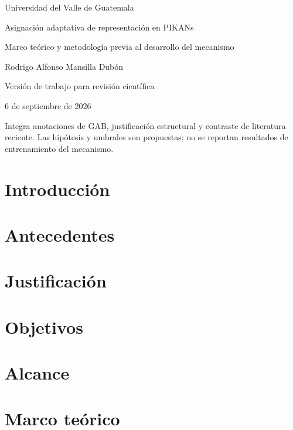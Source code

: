 \documentclass[11pt,letterpaper]{report}
\newcommand{\revision}{Versión de trabajo para revisión científica}
\begin{document}
\hypersetup{pageanchor=false}
\begin{titlepage}\centering
{\Large Universidad del Valle de Guatemala\par}\vspace{1.7cm}
{\Huge Asignación adaptativa de representación en PIKANs\par}\vspace{0.7cm}
{\Large Marco teórico y metodología previa al desarrollo del mecanismo\par}\vfill
{\large Rodrigo Alfonso Mansilla Dubón\par}\vspace{0.6cm}
\revision\par 6 de septiembre de 2026\par\vspace{1cm}
\small Integra anotaciones de GAB, justificación estructural y contraste de literatura reciente. Las hipótesis y umbrales son propuestas; no se reportan resultados de entrenamiento del mecanismo.
\end{titlepage}
\hypersetup{pageanchor=true}
\tableofcontents\listoffigures
\clearpage{}
\chapter{Introducción}
\chapter{Antecedentes}
\chapter{Justificación}
\chapter{Objetivos}
\chapter{Alcance}
\chapter{Marco teórico}

\printbibliography[heading=bibintoc,title={Bibliografía}]
\end{document}
